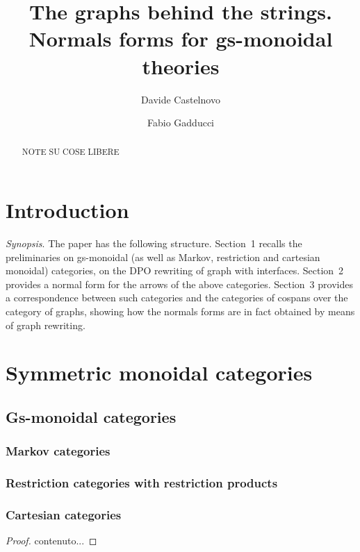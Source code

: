\documentclass[a4paper,UKenglish,cleveref,pdftex,thm-restate,numberwithinsect]{lipics-v2021}
\author{Davide Castelnovo}
{Department of Computer Science, University of Pisa, Italy}
{castelnovod@gmail.com}
{https://orcid.org/0000-0002-5926-5615}{}
\author{Fabio Gadducci}
{Department of Computer Science, University of Pisa, Italy}
{fabio.gadducci@unipi.it}
{https://orcid.org/0000-0003-0690-3051}{}
\title{The graphs behind the strings.\\ Normals forms for gs-monoidal theories}
\begin{document}
	\maketitle
\begin{abstract}
NOTE SU COSE LIBERE
\end{abstract}	

\tableofcontents
\section{Introduction}

\emph{Synopsis}. The paper has the following structure. Section~1 recalls the preliminaries on gs-monoidal  (as well as Markov, restriction and cartesian monoidal) categories,
on the DPO rewriting of graph with interfaces. Section~2 provides a normal form for the arrows of the above categories. Section~3 provides a correspondence between 
such categories and the categories of cospans over the category of graphs, showing how the normals forms are in fact obtained by means of graph rewriting.

\section{Symmetric monoidal categories}
\subsection{Gs-monoidal categories}
\subsubsection{Markov categories}


\subsubsection{Restriction categories with restriction products}


\subsubsection{Cartesian categories}

\begin{theorem}
	
\end{theorem}

\begin{proof}
	contenuto...
\end{proof}
\end{document}

